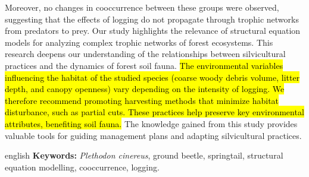 Moreover, no changes in cooccurrence between these groups were observed, suggesting that the effects of logging do not propagate through trophic networks from predators to prey. 
Our study highlights the relevance of structural equation models for analyzing complex trophic networks of forest ecosystems. 
This research deepens our understanding of the relationships between silvicultural practices and the dynamics of forest soil fauna. 
\hl{The environmental variables influencing the habitat of the studied species (coarse woody debris volume, litter depth, and canopy openness) vary depending on the intensity of logging. 
We therefore recommend promoting harvesting methods that minimize habitat disturbance, such as partial cuts. 
These practices help preserve key environmental attributes, benefiting soil fauna.} 
The knowledge gained from this study provides valuable tools for guiding management plans and adapting silvicultural practices. 

\begin{otherlanguage*}{english}
  \textbf{Keywords:} \textit{Plethodon cinereus}, ground beetle, springtail, structural equation modelling, cooccurrence, logging.
  
\end{otherlanguage*}
